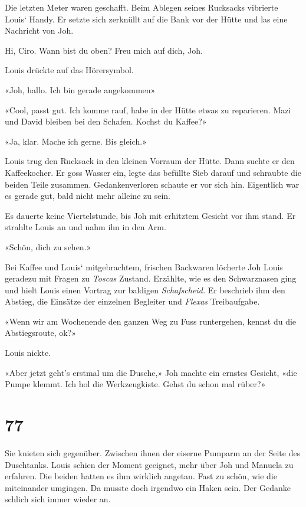 Die letzten Meter waren geschafft. Beim Ablegen seines Rucksacks
vibrierte Louis` Handy. Er setzte sich zerknüllt auf die Bank vor der
Hütte und las eine Nachricht von Joh.

Hi, Ciro. Wann bist du oben? Freu mich auf dich, Joh.

Louis drückte auf das Hörersymbol.

«Joh, hallo. Ich bin gerade angekommen»

«Cool, passt gut. Ich komme rauf, habe in der Hütte etwas zu reparieren.
Mazi und David bleiben bei den Schafen. Kochst du Kaffee?»

«Ja, klar. Mache ich gerne. Bis gleich.»

Louis trug den Rucksack in den kleinen Vorraum der Hütte. Dann suchte er
den Kaffeekocher. Er goss Wasser ein, legte das befüllte Sieb darauf und
schraubte die beiden Teile zusammen. Gedankenverloren schaute er vor
sich hin. Eigentlich war es gerade gut, bald nicht mehr alleine zu sein.

Es dauerte keine Viertelstunde, bis Joh mit erhitztem Gesicht vor ihm
stand. Er strahlte Louis an und nahm ihn in den Arm.

«Schön, dich zu sehen.»

Bei Kaffee und Louis` mitgebrachtem, frischen Backwaren löcherte Joh
Louis geradezu mit Fragen zu \emph{Toscas} Zustand. Erzählte, wie es den
Schwarznasen ging und hielt Louis einen Vortrag zur baldigen
\emph{Schafscheid.} Er beschrieb ihm den Abstieg, die Einsätze der
einzelnen Begleiter und \emph{Flexas} Treibaufgabe.

«Wenn wir am Wochenende den ganzen Weg zu Fuss runtergehen, kennst du
die Abstiegsroute, ok?»

Louis nickte.

«Aber jetzt geht's erstmal um die Dusche,» Joh machte ein ernstes
Gesicht, «die Pumpe klemmt. Ich hol die Werkzeugkiste. Gehst du schon
mal rüber?»

\chapter{77}\label{section-77}

Sie knieten sich gegenüber. Zwischen ihnen der eiserne Pumparm an der
Seite des Duschtanks. Louis schien der Moment geeignet, mehr über Joh
und Manuela zu erfahren. Die beiden hatten es ihm wirklich angetan. Fast
zu schön, wie die miteinander umgingen. Da musste doch irgendwo ein
Haken sein. Der Gedanke schlich sich immer wieder an.

